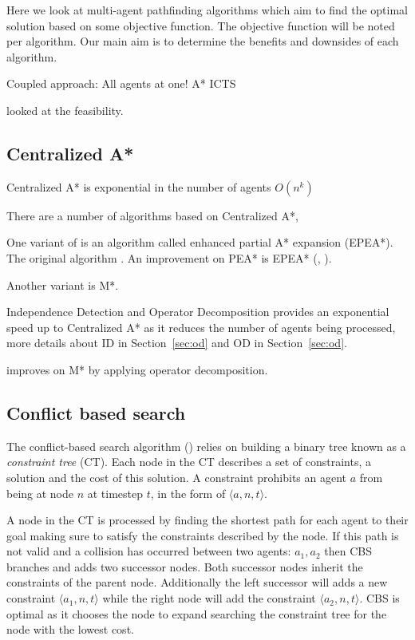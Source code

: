 \documentclass[a4paper,11pt]{article}
\begin{document}
Here we look at multi-agent pathfinding algorithms which aim to find the optimal solution based on some objective function. The objective function will be noted per algorithm. Our main aim is to determine the benefits and downsides of each algorithm.


Coupled approach: All agents at one! A* ICTS

\cite{krontiris2013feasibility} looked at the feasibility.

\subsection{Centralized A*}
Centralized A* is exponential in the number of agents $O(n^k)$

There are a number of algorithms based on Centralized A*, 

One variant of is an algorithm called enhanced partial A* expansion (EPEA*). The original algorithm \cite{yoshizumi2000partial}. An improvement on PEA* is EPEA* (\cite{felner2012partial}, \cite{goldenberg2014enhanced}).

Another variant is M*.

Independence Detection and Operator Decomposition provides an exponential speed up to Centralized A* as it reduces the number of agents being processed, more details about ID in Section~\ref{sec:od} and OD in Section~\ref{sec:od}.

\cite{ferner2013odrm} improves on M* by applying operator decomposition.

\subsection{Conflict based search}
The conflict-based search algorithm (\cite{sharon2015conflict}) relies on building a binary tree known as a  \textit{constraint tree} (CT). Each node in the CT describes a set of constraints, a solution and the cost of this solution. A constraint prohibits an agent $a$ from being at node $n$ at timestep $t$, in the form of $\langle a, n, t \rangle$.

A node in the CT is processed by finding the shortest path for each agent to their goal making sure to satisfy the constraints described by the node. If this path is not valid and a collision has occurred between two agents: $a_1, a_2$ then CBS branches and adds two successor nodes. Both successor nodes inherit the constraints of the parent node. Additionally the left successor will adds a new constraint $\langle a_1, n, t \rangle$ while the right node will add the constraint $\langle a_2, n, t \rangle$. CBS is optimal as it chooses the node to expand searching the constraint tree for the node with the lowest cost.
\end{document}
